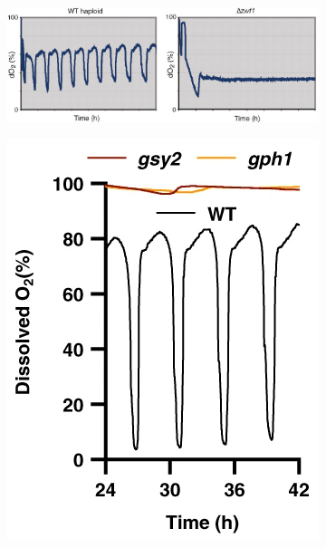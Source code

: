 \begin{figure}[p]
  \centering
  \begin{subfigure}[htpb]{0.9\textwidth}
   \centering
   \includegraphics[width=\textwidth]{tuCyclicChangesMetabolic2007_2c_adapted}
   \caption{
   }
   \label{fig:intro-ymc-zwf1}
  \end{subfigure}
  \begin{subfigure}[htpb]{0.4\textwidth}
   \centering
   \includegraphics[width=\textwidth]{oneillEukaryoticCellBiology2020_5a_adapted}
   \caption{
   }
   \label{fig:intro-ymc-gsy2-gph1}

\end{subfigure}
\end{figure}
